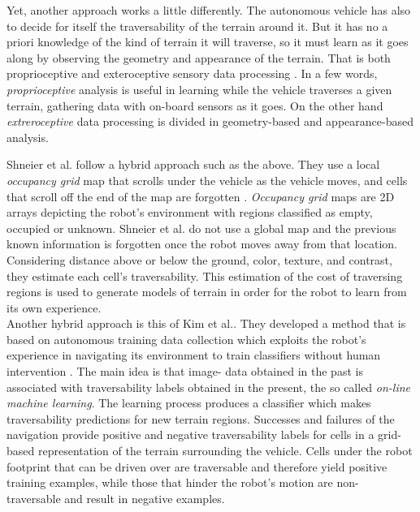 \documentclass[12pt,a4paper]{report}
\newcommand{\etal}[1]{#1 et al.}
\newcommand{\term}{\textit}
\newcommand{\acronym}{\MakeUppercase}
\begin{document}
	Yet, another approach works a little differently. The autonomous 
	vehicle has also to decide for itself the traversability of the terrain 
	around it. But it has no a priori knowledge of the kind of terrain it will 
	traverse, so it must learn as it goes along by observing the geometry and 
	appearance of the terrain. That is both proprioceptive and exteroceptive sensory 
	data processing \cite{Papadakis}. In a few words, \term{proprioceptive} analysis 
	is useful in learning while the vehicle traverses a given terrain, gathering data 
	with on-board sensors as it goes. On the other hand \term{extreroceptive} data 
	processing is divided in geometry-based and appearance-based analysis. 
	\par
	\etal{Shneier} follow a hybrid approach such as the above. They use a local 
	\term{occupancy grid} map that scrolls under the vehicle as the vehicle moves,
	and cells that scroll off the end of the map are forgotten \cite{Shneier}. 
	\term{Occupancy grid} maps \cite{Moravec} are \acronym{2d} arrays depicting the 
	robot’s environment with regions classified as empty, occupied or unknown.
	\etal{Shneier} \cite{Shneier} do not 
	use a global map and the previous known information is forgotten once the robot 
	moves away from that location. Considering distance above or below the ground, 
	color, texture, and contrast, they estimate each cell’s traversability. 
	This estimation of the cost of traversing regions is used to generate models of 
	terrain in order for the robot to learn from its own experience.
	\\
	
	Another hybrid approach is this of \etal{Kim}. They 
	developed a method that is based on autonomous training data collection which 
	exploits the robot’s experience in navigating its environment to train 
	classifiers without human intervention \cite{Kim}. The main idea is that image-
	data obtained in the past is associated with traversability labels 
	obtained in the present, the so called \term{on-line machine learning}. The 
	learning process produces a classifier which makes traversability 
	predictions for new terrain regions. Successes and failures of the navigation 
	provide positive and negative traversability labels for cells in a grid-
	based representation of the terrain surrounding the vehicle. Cells under the 
	robot footprint that can be driven over are traversable and therefore yield 
	positive training examples, while those that hinder the robot’s motion are non-
	traversable and result in negative examples.
	\\
	
\end{document}
